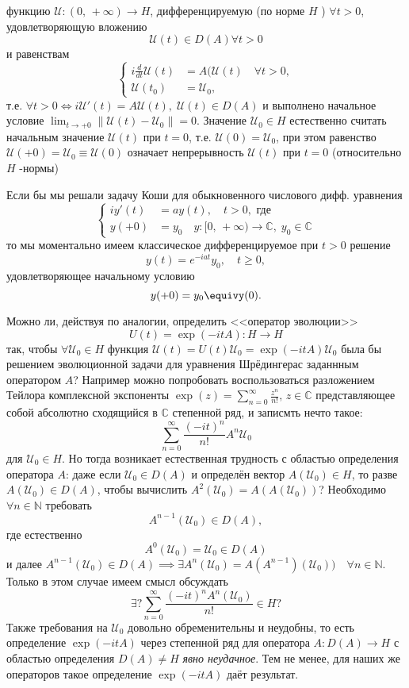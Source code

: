 функцию $\mathcal{U}: (0,\,+\infty)\to  H$, дифференцируемую (по норме $H$ )
$\forall t >0$, удовлетворяющую вложению
\[
	\mathcal{U}(t) \in  D(A) \forall t> 0
\]
и равенствам
 \[
\left\{
\begin{aligned}
	i \frac{d}{dt} \mathcal{U}(t) &= A (\mathcal{U}(t) \quad \forall t>0,\\
	\mathcal{U}(t_0)&=\mathcal{U}_0,
\end{aligned}
\right.
\] 
т.е. $\forall t>0 \Leftrightarrow i \mathcal{U}'(t)=A \mathcal{U}(t), \; \mathcal{U}(t) \in  D(A)$ 
и выполнено начальное условие $\lim_{t \to +0} \| 
\mathcal{U}(t) -\mathcal{U}_0\|=0 $. Значение $\mathcal{U}_0 \in H$ естественно считать
начальным значение $\mathcal{U}(t)$ при $t=0$, т.\:е. $\mathcal{U}(0)=\mathcal{U}_0$, при этом
равенство $\mathcal{U}(+0)=\mathcal{U}_0\equiv \mathcal{U}(0)$ означает непрерывность $\mathcal{U}(t)$ при
$t=0$ (относительно $H$ -нормы)
\begin{rem}
	Если бы мы решали задачу Коши для обыкновенного
	числового дифф. уравнения
	\[
	\left\{
	\begin{aligned}
		i y'(t) &= a y(t), \quad t>0, \text{ где}\\
		y(+0)&=y_0 \quad y:[0,\,+\infty) \to \mathbb{C},\; y_0 \in \mathbb{C}
	\end{aligned}
	\right.
	\]
	то мы моментально имеем классическое дифференцируемое
	при $t>0$ решение
	\[
		y(t)= e^{-i a t}y_0, \quad t\ge 0,
	\]
	удовлетворяющее начальному условию
	\[
		y(+0)=y_0\equivy(0)
	.\] 
\end{rem}
Можно ли, действуя по аналогии, определить <<оператор эволюции>>
\[
	U(t) =\exp(-i t A) : H \to  H
\]
так, чтобы $\forall \mathcal{U}_0 \in H$  функция $\mathcal{U}(t) = U(t) \mathcal{U}_0=
\exp (-itA)\mathcal{U}_0$ была бы решением эволюционной задачи для уравнения
Шрёдингерас заданнным оператором $A$? Например можно попробовать
воспользоваться разложением Тейлора комплексной экспоненты
$\exp(z)=\sum_{n=0}^{\infty} \frac{z^n}{n!},\, z \in \mathbb{C}$
представляющее собой абсолютно сходящийся в $\mathbb{C}$ степенной
ряд, и  записмть нечто такое:
\[
	\sum_{n=0}^{\infty} \frac{(-it)^n}{n!}A^n \mathcal{U}_0
\]
для $\mathcal{U}_0 \in H$. Но тогда возникает естественная трудность
с областью определения оператора $A$:
даже если  $\mathcal{U}_0 \in D(A)$ и определён вектор $A(\mathcal{U}_0) \in H$,
то разве $A(\mathcal{U}_0) \in D(A)$, чтобы вычислить $A^2(\mathcal{U}_0)=
A(A(\mathcal{U}_0))$? Необходимо $\forall n \in  \mathbb{N}$ требовать
\[
	A^{n-1}(\mathcal{U}_0) \in D(A),
\] 
где естественно
\[
	A^0(\mathcal{U}_0)= \mathcal{U}_0 \in D(A)
\]
и далее $A^{n-1}(\mathcal{U}_0) \in D(A) \implies \exists A^n(\mathcal{U}_0)=
A(A^{n-1})(\mathcal{U}_0)) \quad \forall n \in \mathbb{N}$. Только в этом
случае имеем смысл обсуждать
\[
	\exists ? \sum_{n=0}^{\infty} \frac{(-it)^n A^n (\mathcal{U}_0)}{n!} \in H ?
\] 
Также требования на $\mathcal{U}_0$ довольно обременительны и неудобны, то
есть определение $\exp(-i t A)$ через степенной ряд для
оператора $A : D(A) \to H$ с областью определения $D(A) \neq H$ 
\emph{явно неудачное}. Тем не менее, для наших же операторов
такое определение $\exp (-it A)$ даёт результат.

